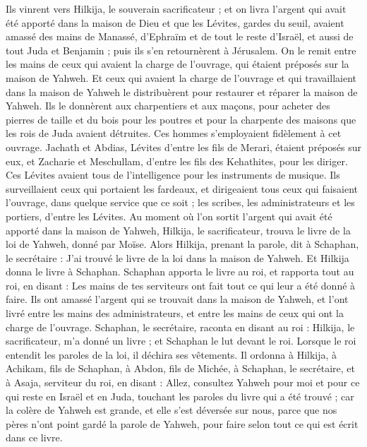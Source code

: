 \begin{multicols}{2}
Ils vinrent vers Hilkija, le souverain sacrificateur ; et on livra l'argent qui avait été apporté dans la maison de Dieu et que les Lévites, gardes du seuil, avaient amassé des mains de Manassé, d'Ephraïm et de tout le reste d'Israël, et aussi de tout Juda et Benjamin ; puis ils s'en retournèrent à Jérusalem.
On le remit entre les mains de ceux qui avaient la charge de l'ouvrage, qui étaient préposés sur la maison de Yahweh. Et ceux qui avaient la charge de l'ouvrage et qui travaillaient dans la maison de Yahweh le distribuèrent pour restaurer et réparer la maison de Yahweh.
Ils le donnèrent aux charpentiers et aux maçons, pour acheter des pierres de taille et du bois pour les poutres et pour la charpente des maisons que les rois de Juda avaient détruites.
Ces hommes s'employaient fidèlement à cet ouvrage. Jachath et Abdias, Lévites d'entre les fils de Merari, étaient préposés sur eux, et Zacharie et Meschullam, d'entre les fils des Kehathites, pour les diriger. Ces Lévites avaient tous de l'intelligence pour les instruments de musique.
Ils surveillaient ceux qui portaient les fardeaux, et dirigeaient tous ceux qui faisaient l'ouvrage, dans quelque service que ce soit ; les scribes, les administrateurs et les portiers, d'entre les Lévites.
Au moment où l'on sortit l'argent qui avait été apporté dans la maison de Yahweh, Hilkija, le sacrificateur, trouva le livre de la loi de Yahweh, donné par Moïse.
Alors Hilkija, prenant la parole, dit à Schaphan, le secrétaire : J'ai trouvé le livre de la loi dans la maison de Yahweh. Et Hilkija donna le livre à Schaphan.
Schaphan apporta le livre au roi, et rapporta tout au roi, en disant : Les mains de tes serviteurs ont fait tout ce qui leur a été donné à faire.
Ils ont amassé l'argent qui se trouvait dans la maison de Yahweh, et l'ont livré entre les mains des administrateurs, et entre les mains de ceux qui ont la charge de l'ouvrage.
Schaphan, le secrétaire, raconta en disant au roi : Hilkija, le sacrificateur, m'a donné un livre ; et Schaphan le lut devant le roi.
Lorsque le roi entendit les paroles de la loi, il déchira ses vêtements.
Il ordonna à Hilkija, à Achikam, fils de Schaphan, à Abdon, fils de Michée, à Schaphan, le secrétaire, et à Asaja, serviteur du roi, en disant :
Allez, consultez Yahweh pour moi et pour ce qui reste en Israël et en Juda, touchant les paroles du livre qui a été trouvé ; car la colère de Yahweh est grande, et elle s'est déversée sur nous, parce que nos pères n'ont point gardé la parole de Yahweh, pour faire selon tout ce qui est écrit dans ce livre.

\end{multicols}
